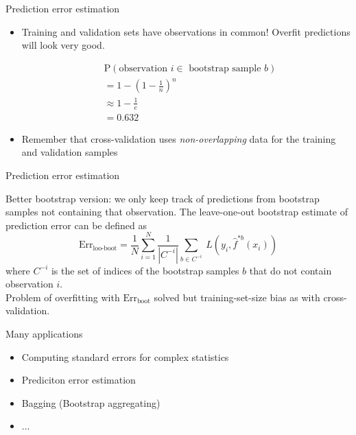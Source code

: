 \documentclass[14pt]{beamer}
\begin{document}
\begin{frame}[plain]{Prediction error estimation}
%

\begin{itemize}
	\item Training and validation sets have observations in common! Overfit predictions will look very good.
	
	
\begin{align*}
	&\text{P}(\text{observation~} i \in \text{~bootstrap sample~} b) \\
	&= 1 - (1 - \frac1n)^n \\
	&\approx 1 - \frac1e \\
	&= 0.632
\end{align*}
	
	\item Remember that cross-validation uses \emph{non-overlapping} data for the training and validation samples
\end{itemize}



\end{frame}


\begin{frame}[plain]{Prediction error estimation}

Better bootstrap version: we only keep track of predictions from bootstrap samples not containing that observation. The leave-one-out bootstrap estimate of prediction error can be defined as
\[ 
\text{Err}_{\text{loo-boot}} = \frac1N \sum_{i = 1}^N \frac{1}{|C^{-i}|}\sum_{b \in C^{-i}} \ L(y_i, \hat f^{*b}(x_i))
\]
where $C^{-i}$ is the set of indices of the bootstrap samples $b$ that do not contain observation $i$.\\

Problem of overfitting with $\text{Err}_{\text{boot}}$ solved but training-set-size bias as with cross-validation.

\end{frame}

\begin{frame}[plain]{Many applications}

\begin{itemize}
	\item Computing standard errors for complex statistics
	\item Prediciton error estimation
	\item Bagging (Bootstrap aggregating)
	\item ...
\end{itemize}	
\end{frame}
\end{document}
